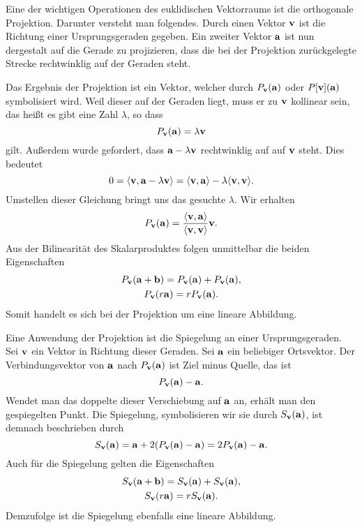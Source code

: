 Eine der wichtigen Operationen des euklidischen Vektorraums ist
die orthogonale Projektion. Darunter versteht man folgendes.
Durch einen Vektor $\mathbf{v}$ ist die Richtung einer Ursprungsgeraden
gegeben. Ein zweiter Vektor $\mathbf{a}$ ist nun dergestalt auf die
Gerade zu projizieren, dass die bei der Projektion zurückgelegte
Strecke rechtwinklig auf der Geraden steht.

Das Ergebnis der Projektion ist ein Vektor, welcher durch
$P_{\mathbf{v}}(\mathbf{a})$ oder $P[\mathbf{v}](\mathbf{a})$ symbolisiert wird.
Weil dieser auf der Geraden liegt, muss er zu $\mathbf{v}$ kollinear
sein, das heißt es gibt eine Zahl $\lambda$, so dass%
\[P_{\mathbf{v}}(\mathbf{a}) = \lambda\mathbf{v}\]
gilt. Außerdem wurde gefordert, dass $\mathbf{a}-\lambda\mathbf{v}$
rechtwinklig auf auf $\mathbf{v}$ steht. Dies bedeutet%
\[0 = \langle\mathbf{v},\mathbf{a}-\lambda\mathbf{v}\rangle
= \langle\mathbf{v},\mathbf{a}\rangle - \lambda\langle\mathbf{v},\mathbf{v}\rangle.\]
Umstellen dieser Gleichung bringt uns das gesuchte $\lambda$. Wir
erhalten%
\[P_{\mathbf{v}}(\mathbf{a}) = \frac{\langle\mathbf{v},\mathbf{a}\rangle}
{\langle\mathbf{v},\mathbf{v}\rangle}\mathbf{v}.\]
Aus der Bilinearität des Skalarproduktes folgen unmittelbar
die beiden Eigenschaften%
\begin{gather*}
P_{\mathbf{v}}(\mathbf{a}+\mathbf{b}) = P_{\mathbf{v}}(\mathbf{a})+P_{\mathbf{v}}(\mathbf{a}),\\
P_{\mathbf{v}}(r\mathbf{a}) = rP_{\mathbf{v}}(\mathbf{a}).
\end{gather*}
Somit handelt es sich bei der Projektion um eine lineare
Abbildung.

Eine Anwendung der Projektion ist die Spiegelung an einer
Ursprungsgeraden. Sei $\mathbf{v}$ ein Vektor in Richtung dieser
Geraden. Sei $\mathbf{a}$ ein beliebiger Ortsvektor.
Der Verbindungsvektor von $\mathbf{a}$ nach $P_{\mathbf{v}}(\mathbf{a})$
ist Ziel minus Quelle, das ist%
\[P_{\mathbf{v}}(\mathbf{a}) - \mathbf{a}.\]
Wendet man das doppelte dieser Verschiebung auf $\mathbf{a}$ an,
erhält man den gespiegelten Punkt. Die Spiegelung, symbolisieren
wir sie durch $S_{\mathbf{v}}(\mathbf{a})$, ist demnach
beschrieben durch%
\[S_{\mathbf{v}}(\mathbf{a}) = \mathbf{a} + 2(P_{\mathbf{v}}(\mathbf{a}) - \mathbf{a})
= 2P_{\mathbf{v}}(\mathbf{a}) - \mathbf{a}.\]
Auch für die Spiegelung gelten die Eigenschaften%
\begin{gather*}
S_{\mathbf{v}}(\mathbf{a}+\mathbf{b}) = S_{\mathbf{v}}(\mathbf{a})+S_{\mathbf{v}}(\mathbf{a}),\\
S_{\mathbf{v}}(r\mathbf{a}) = rS_{\mathbf{v}}(\mathbf{a}).
\end{gather*}
Demzufolge ist die Spiegelung ebenfalls eine lineare Abbildung.

